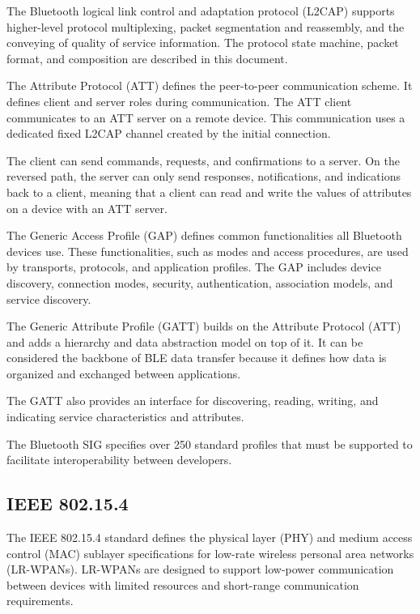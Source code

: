 The Bluetooth logical link control and adaptation protocol (L2CAP) supports
higher-level protocol multiplexing, packet segmentation and reassembly,
and the conveying of quality of service information.
The protocol state machine, packet format, and composition are described
in this document. \cite{Townsend14}

The Attribute Protocol (ATT) defines the peer-to-peer communication scheme. It defines client and server roles during communication. The ATT client communicates to an ATT server on a remote device. This communication uses a dedicated fixed L2CAP channel created by the initial connection.

The client can send commands, requests, and confirmations to a server. On the reversed path, the server can only send responses, notifications, and indications back to a client, meaning that a client can read and write the values of attributes on a device with an ATT server.

The Generic Access Profile (GAP) defines common functionalities all Bluetooth devices use.
These functionalities, such as modes and access procedures, are used by transports, protocols, and application profiles.
The GAP includes device discovery, connection modes, security, authentication, association models, and service discovery.

The Generic Attribute Profile (GATT) builds on the Attribute Protocol (ATT) and adds a hierarchy and data abstraction model on top of it.
It can be considered the backbone of BLE data transfer because it defines how data is organized and exchanged between applications.

The GATT also provides an interface for discovering, reading, writing, and indicating service characteristics and attributes.

The Bluetooth SIG specifies over 250 standard profiles that must be supported to facilitate interoperability between developers. \cite{gatt_sup}

\subsection{IEEE 802.15.4}
\label{sec:15_4}

The IEEE 802.15.4 standard defines the physical layer (PHY) and medium access control (MAC)
sublayer specifications for low-rate wireless personal area networks (LR-WPANs). \cite{kozlowski:2017}
LR-WPANs are designed to support low-power communication between devices
with limited resources and short-range communication requirements.

